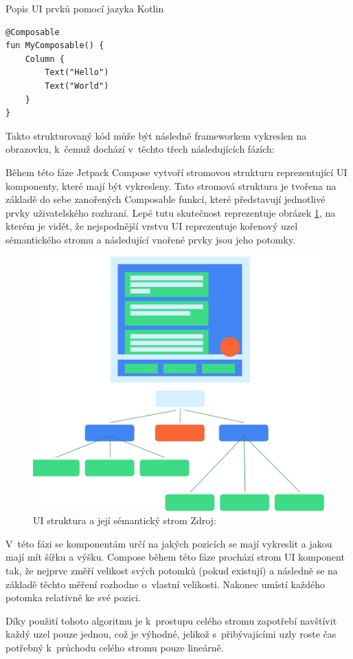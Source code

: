 \begin{listing}[H]
\caption{Popis UI prvků pomocí jazyka Kotlin}\label{lst:ComposeCode}
\begin{verbatim}
@Composable
fun MyComposable() {
    Column {
        Text("Hello")
        Text("World")
    }
}
\end{verbatim}
\end{listing}

Takto strukturovaný kód může být následně frameworkem vykreslen na obrazovku, k~čemuž dochází v~těchto třech následujících fázích:

Během této fáze Jetpack Compose vytvoří stromovou strukturu reprezentující UI komponenty, které mají být vykresleny.\cite{jetpackPhases} 
Tato stromová struktura je tvořena na základě do sebe zanořených Composable funkcí, které představují jednotlivé prvky uživatelského rozhraní.
Lepé tutu skutečnost reprezentuje obrázek \ref{fig:semantics-ui-tree}, na kterém je vidět, že nejspodnější vrstvu UI reprezentuje kořenový uzel
sémantického stromu a následující vnořené prvky jsou jeho potomky.

\begin{figure}[H]
  \centering
  \includegraphics[width=.5\textwidth]{semantics-ui-tree.png}
  \caption{UI struktura a její sémantický strom Zdroj: \cite{imgSemantics}}
  \label{fig:semantics-ui-tree}
\end{figure}

V~této fázi se komponentám určí na jakých pozicích se mají vykreslit a jakou mají mít šířku a výšku.
Compose během této fáze prochází strom UI komponent tak, že nejprve změří velikost svých potomků (pokud existují) a následně se 
na základě těchto měření rozhodne o~vlastní velikosti. Nakonec umístí každého potomka relativně ke své pozici.\cite{jetpackPhases}

Díky použití tohoto algoritmu je k~prostupu celého stromu zapotřebí navštívit každý uzel pouze jednou, což je výhodné, jelikož
s~přibývajícími uzly roste čas potřebný k~průchodu celého stromu pouze lineárně. \cite{jetpackPhases}

